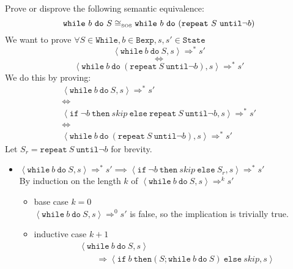 \begin{exercise}{
    Prove or disprove the following semantic equivalence:
    \[ \texttt{while}\ b\ \texttt{do}\ S \cong_{\text{\tiny SOS}} \texttt{while}\ b\ \texttt{do}\ (\texttt{repeat}\ S\ \texttt{until} \neg b)  \]\vspace*{-0.6cm}
}
    We want to prove $\forall S \in \texttt{While}, b \in \texttt{Bexp}, s, s' \in \texttt{State}$
    \[ \left<\texttt{while}\ b\ \texttt{do}\ S, s\right> \Rightarrow^* s' \]\vspace*{-0.9cm}
    \[ \iff \]\vspace*{-0.7cm}
    \[ \left<\texttt{while}\ b\ \texttt{do}\ (\texttt{repeat}\ S\ \texttt{until} \neg b), s\right> \Rightarrow^* s' \]
    We do this by proving:
    \begin{gather*}
        \left<\texttt{while}\ b\ \texttt{do}\ S, s\right> \Rightarrow^* s' \\
        \iff \\
        \left<\texttt{if}\ \neg b\ \texttt{then}\ skip\ \texttt{else}\ \texttt{repeat}\ S\ \texttt{until} \neg b, s\right> \Rightarrow^* s' \\
        \iff \\
        \left<\texttt{while}\ b\ \texttt{do}\ (\texttt{repeat}\ S\ \texttt{until} \neg b), s\right> \Rightarrow^* s'
    \end{gather*}
    Let $S_r = \texttt{repeat}\ S\ \texttt{until} \neg b$ for brevity.
    \begin{itemize}
        \item $\left<\texttt{while}\ b\ \texttt{do}\ S, s\right> \Rightarrow^* s' \implies \left<\texttt{if}\ \neg b\ \texttt{then}\ skip\ \texttt{else}\ S_r, s\right> \Rightarrow^* s'$ \\
            By induction on the length $k$ of $\left<\texttt{while}\ b\ \texttt{do}\ S, s\right> \Rightarrow^k s'$
            \begin{itemize}
                \item base case $k=0$ \\
                $\left<\texttt{while}\ b\ \texttt{do}\ S, s\right> \Rightarrow^0 s'$ is false, so the implication is trivially true.
                \item inductive case $k+1$ \vspace*{-0.3cm}
                \begin{align*}
                    &\left<\texttt{while}\ b\ \texttt{do}\ S, s\right>
                    \\&\qquad\Rightarrow \left<\texttt{if}\ b\ \texttt{then} (S; \texttt{while}\ b\ \texttt{do}\ S)\ \texttt{else}\ skip, s\right>

\end{align*}
\end{itemize}
\end{itemize}
\end{exercise}
